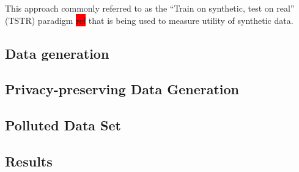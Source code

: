 This approach commonly referred to as the ``Train on synthetic, test on real'' (TSTR) paradigm \colorbox{red}{ref} that is being used to measure utility of synthetic data.

\subsection{Data generation}

\subsection{Privacy-preserving Data Generation}

\subsection{Polluted Data Set}

\subsection{Results}